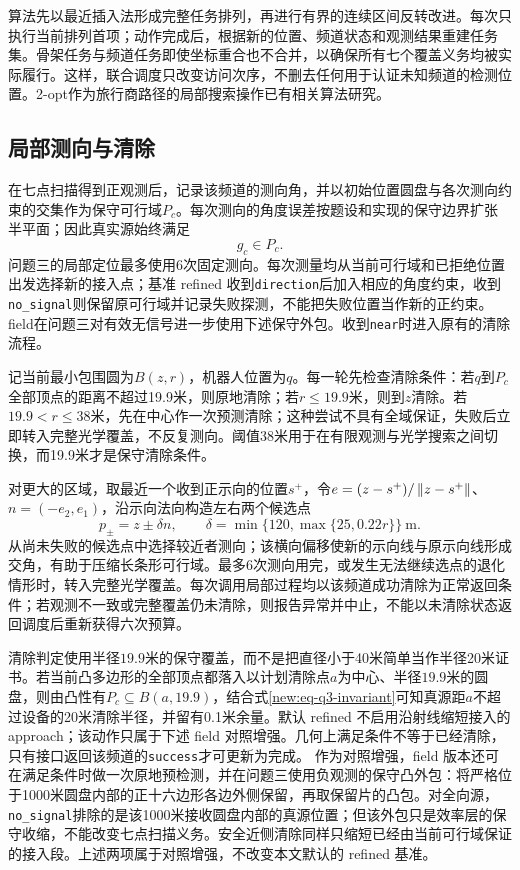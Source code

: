 算法先以最近插入法形成完整任务排列，再进行有界的连续区间反转改进。每次只执行当前排列首项；动作完成后，根据新的位置、频道状态和观测结果重建任务集。骨架任务与频道任务即使坐标重合也不合并，以确保所有七个覆盖义务均被实际履行。这样，联合调度只改变访问次序，不删去任何用于认证未知频道的检测位置。2-opt作为旅行商路径的局部搜索操作已有相关算法研究\cite{wang}。

\subsection{局部测向与清除}
在七点扫描得到正观测后，记录该频道的测向角，并以初始位置圆盘与各次测向约束的交集作为保守可行域$P_c$。每次测向的角度误差按题设和实现的保守边界扩张半平面；因此真实源始终满足
\begin{equation}
 g_c\in P_c.
 \label{new:eq-q3-invariant}
\end{equation}
问题三的局部定位最多使用6次固定测向。每次测量均从当前可行域和已拒绝位置出发选择新的接入点；基准 refined 收到\texttt{direction}后加入相应的角度约束，收到\texttt{no\_signal}则保留原可行域并记录失败探测，不能把失败位置当作新的正约束。field在问题三对有效无信号进一步使用下述保守外包。收到\texttt{near}时进入原有的清除流程。

记当前最小包围圆为$B(z,r)$，机器人位置为$q$。每一轮先检查清除条件：若$q$到$P_c$全部顶点的距离不超过19.9米，则原地清除；若$r\le19.9$米，则到$z$清除。若$19.9<r\le38$米，先在中心作一次预测清除；这种尝试不具有全域保证，失败后立即转入完整光学覆盖，不反复测向。阈值38米用于在有限观测与光学搜索之间切换，而19.9米才是保守清除条件。

对更大的区域，取最近一个收到正示向的位置$s^+$，令$e=(z-s^+)/\left\lVert z-s^+\right\rVert$、$n=(-e_2,e_1)$，沿示向法向构造左右两个候选点
\[
 p_\pm=z\pm\delta n,\qquad
 \delta=\min\{120,\max\{25,0.22r\}\}\ \mathrm m.
\]
从尚未失败的候选点中选择较近者测向；该横向偏移使新的示向线与原示向线形成交角，有助于压缩长条形可行域。最多6次测向用完，或发生无法继续选点的退化情形时，转入完整光学覆盖。每次调用局部过程均以该频道成功清除为正常返回条件；若观测不一致或完整覆盖仍未清除，则报告异常并中止，不能以未清除状态返回调度后重新获得六次预算。

清除判定使用半径$19.9$米的保守覆盖，而不是把直径小于40米简单当作半径20米证书。若当前凸多边形的全部顶点都落入以计划清除点$a$为中心、半径$19.9$米的圆盘，则由凸性有$P_c\subseteq B(a,19.9)$，结合式\eqref{new:eq-q3-invariant}可知真源距$a$不超过设备的20米清除半径，并留有0.1米余量。默认 refined 不启用沿射线缩短接入的 approach；该动作只属于下述 field 对照增强。几何上满足条件不等于已经清除，只有接口返回该频道的\texttt{success}才可更新为完成。
作为对照增强，field 版本还可在满足条件时做一次原地预检测，并在问题三使用负观测的保守凸外包：将严格位于1000米圆盘内部的正十六边形各边外侧保留，再取保留片的凸包。对全向源，\texttt{no\_signal}排除的是该1000米接收圆盘内部的真源位置；但该外包只是效率层的保守收缩，不能改变七点扫描义务。安全近侧清除同样只缩短已经由当前可行域保证的接入段。上述两项属于对照增强，不改变本文默认的 refined 基准。

